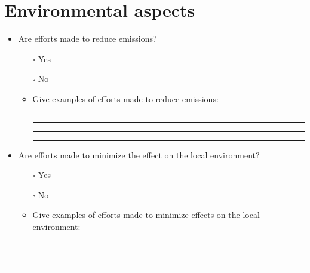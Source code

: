 \documentclass[
  12pt,
]{scrbook}
\begin{document}
\hypertarget{environmental-aspects}{%
\section*{Environmental aspects}\label{environmental-aspects}}

\begin{itemize}
\item
  Are efforts made to reduce emissions?

  \begin{itemize}
  \item[$\square$]
    Yes
  \item[$\square$]
    No
  \item
    Give examples of efforts made to reduce emissions:

    \begin{center}\rule{0.5\linewidth}{0.5pt}\end{center}

    \begin{center}\rule{0.5\linewidth}{0.5pt}\end{center}

    \begin{center}\rule{0.5\linewidth}{0.5pt}\end{center}

    \begin{center}\rule{0.5\linewidth}{0.5pt}\end{center}
  \end{itemize}
\item
  Are efforts made to minimize the effect on the local environment?

  \begin{itemize}
  \item[$\square$]
    Yes
  \item[$\square$]
    No
  \item
    Give examples of efforts made to minimize effects on the local environment:

    \begin{center}\rule{0.5\linewidth}{0.5pt}\end{center}

    \begin{center}\rule{0.5\linewidth}{0.5pt}\end{center}

    \begin{center}\rule{0.5\linewidth}{0.5pt}\end{center}

    \begin{center}\rule{0.5\linewidth}{0.5pt}\end{center}
  \end{itemize}
\end{itemize}
\end{document}
